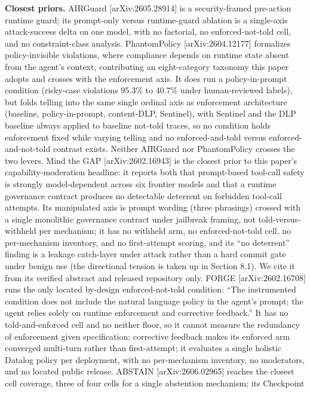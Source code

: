 \documentclass[
]{article}
\begin{document}
\textbf{Closest priors.} AIRGuard {[}arXiv:2605.28914{]} is a
security-framed pre-action runtime guard; its prompt-only versus
runtime-guard ablation is a single-axis attack-success delta on one
model, with no factorial, no enforced-not-told cell, and no
constraint-class analysis. PhantomPolicy {[}arXiv:2604.12177{]}
formalizes policy-invisible violations, where compliance depends on
runtime state absent from the agent's context, contributing an
eight-category taxonomy this paper adopts and crosses with the
enforcement axis. It does run a policy-in-prompt condition (risky-case
violations 95.3\% to 40.7\% under human-reviewed labels), but folds
telling into the same single ordinal axis as enforcement architecture
(baseline, policy-in-prompt, content-DLP, Sentinel), with Sentinel and
the DLP baseline always applied to baseline not-told traces, so no
condition holds enforcement fixed while varying telling and no
enforced-and-told versus enforced-and-not-told contrast exists. Neither
AIRGuard nor PhantomPolicy crosses the two levers. Mind the GAP
{[}arXiv:2602.16943{]} is the closest prior to this paper's
capability-moderation headline: it reports both that prompt-based
tool-call safety is strongly model-dependent across six frontier models
and that a runtime governance contract produces no detectable deterrent
on forbidden tool-call attempts. Its manipulated axis is prompt wording
(three phrasings) crossed with a single monolithic governance contract
under jailbreak framing, not told-versus-withheld per mechanism; it has
no withheld arm, no enforced-not-told cell, no per-mechanism inventory,
and no first-attempt scoring, and its ``no deterrent'' finding is a
leakage catch-layer under attack rather than a hard commit gate under
benign use (the directional tension is taken up in Section 8.1). We cite
it from its verified abstract and released repository only. FORGE
{[}arXiv:2602.16708{]} runs the only located by-design enforced-not-told
condition: ``The instrumented condition does not include the natural
language policy in the agent's prompt; the agent relies solely on
runtime enforcement and corrective feedback.'' It has no
told-and-enforced cell and no neither floor, so it cannot measure the
redundancy of enforcement given specification; corrective feedback makes
its enforced arm converged multi-turn rather than first-attempt; it
evaluates a single holistic Datalog policy per deployment, with no
per-mechanism inventory, no moderators, and no located public release.
ABSTAIN {[}arXiv:2606.02965{]} reaches the closest cell coverage, three
of four cells for a single abstention mechanism; its Checkpoint
\end{document}
